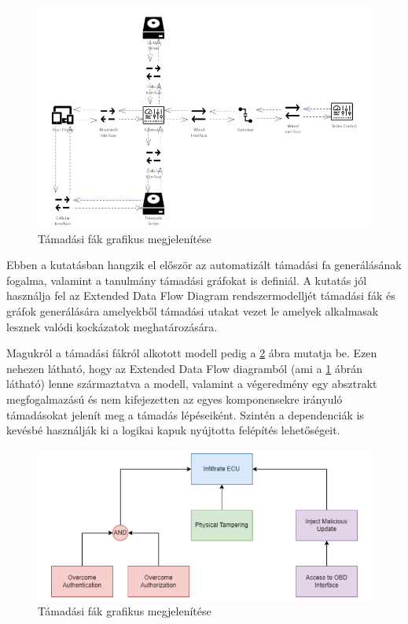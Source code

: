 \begin{figure}[!ht]
	\centering
	\includegraphics[width=125mm, keepaspectratio]{figures/03_CHULP_EDD.png}
	\caption{Támadási fák grafikus megjelenítése\cite{Chulp}}
	\label{fig:CHULP_EDD}
\end{figure}

Ebben a kutatásban hangzik el először az automatizált támadási fa generálásának fogalma, valamint a tanulmány támadási gráfokat is definiál. A kutatás jól használja fel az Extended Data Flow Diagram rendszermodelljét támadási fák és gráfok generálására amelyekből támadási utakat vezet le amelyek alkalmasak lesznek valódi kockázatok meghatározására.

Magukról a támadási fákról alkotott modell pedig a \ref{fig:CHULP_AT} ábra mutatja be. Ezen nehezen látható, hogy az Extended Data Flow diagramból (ami a \ref{fig:CHULP_EDD} ábrán látható) lenne származtatva a modell, valamint a végeredmény egy absztrakt megfogalmazású és nem kifejezetten az egyes komponensekre irányuló támadásokat jelenít meg a támadás lépéseiként. Szintén a dependenciák is kevésbé használják ki a logikai kapuk nyújtotta felépítés lehetőségeit.

\begin{figure}[!ht]
	\centering
	\includegraphics[width=125mm, keepaspectratio]{figures/03_CHULP_AT.png}
	\caption{Támadási fák grafikus megjelenítése\cite{Chulp}}
	\label{fig:CHULP_AT}
\end{figure}

